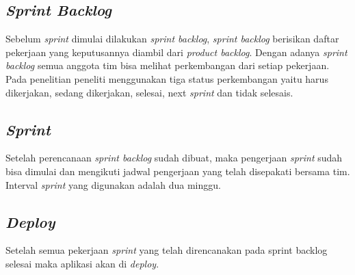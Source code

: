 \subsection{\emph{Sprint Backlog}}
Sebelum \emph{sprint} dimulai dilakukan \emph{sprint backlog}, \emph{sprint backlog} berisikan daftar pekerjaan yang keputusannya diambil dari \emph{product backlog}. Dengan adanya \emph{sprint backlog} semua anggota tim bisa melihat perkembangan dari setiap pekerjaan. Pada penelitian peneliti menggunakan tiga status perkembangan yaitu harus dikerjakan, sedang dikerjakan, selesai, next \emph{sprint} dan tidak selesais.

\subsection{\emph{Sprint}}
Setelah perencanaan \emph{sprint backlog} sudah dibuat, maka pengerjaan \emph{sprint} sudah bisa dimulai dan mengikuti jadwal pengerjaan yang telah disepakati bersama tim. Interval \emph{sprint} yang digunakan adalah dua minggu.

\subsection{\emph{Deploy}}
Setelah semua pekerjaan \emph{sprint} yang telah direncanakan pada sprint backlog selesai maka aplikasi akan di \emph{deploy}.

